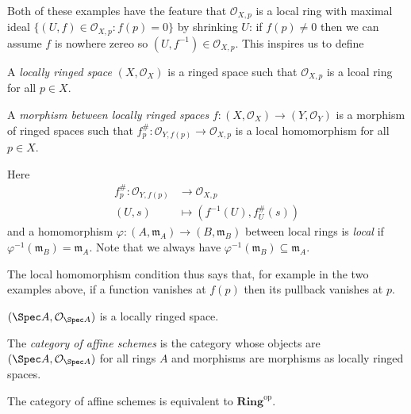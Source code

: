 \documentclass[a4paper]{article}
\renewcommand{\c}[1]{\mathbf{#1}} %
\newcommand{\sh}[1]{\mathcal{#1}} %
\begin{document}
Both of these examples have the feature that \(\sh O_{X, p}\) is a local ring with maximal ideal \(\{(U, f) \in \sh O_{X, p}: f(p) = 0\}\) by shrinking \(U\): if \(f(p) \neq 0\) then we can assume \(f\) is nowhere zereo so \((U, f^{-1}) \in \sh O_{X, p}\). This inspires us to define

\begin{definition}
  A \emph{locally ringed space} \((X, \sh O_X)\) is a ringed space such that \(\sh O_{X, p}\) is a lcoal ring for all \(p \in X\).

  A \emph{morphism between locally ringed spaces} \(f: (X, \sh O_X) \to (Y, \sh O_Y)\) is a morphism of ringed spaces such that \(f_p^\#: \sh O_{Y, f(p)} \to \sh O_{X, p}\) is a local homomorphism for all \(p \in X\).
\end{definition}
Here
\begin{align*}
  f_p^\#: \sh O_{Y, f(p)} &\to \sh O_{X, p} \\
  (U, s) &\mapsto (f^{-1}(U), f_U^\#(s))
\end{align*}
and a homomorphism \(\varphi: (A, \mathfrak m_A) \to (B, \mathfrak m_B)\) between local rings is \emph{local} if \(\varphi^{-1}(\mathfrak m_B) = \mathfrak m_A\). Note that we always have \(\varphi^{-1}(\mathfrak m_B) \subseteq \mathfrak m_A\).

The local homomorphism condition thus says that, for example in the two examples above, if a function vanishes at \(f(p)\) then its pullback vanishes at \(p\).

\begin{eg}
  \((\Spec A, \sh O_{\Spec A})\) is a locally ringed space.
\end{eg}

\begin{definition}
  The \emph{category of affine schemes} is the category whose objects are \((\Spec A, \sh O_{\Spec A})\) for all rings \(A\) and morphisms are morphisms as locally ringed spaces.
\end{definition}

\begin{theorem}
  The category of affine schemes is equivalent to \(\c{Ring}^{\mathrm{op}}\).
\end{theorem}
\end{document}
